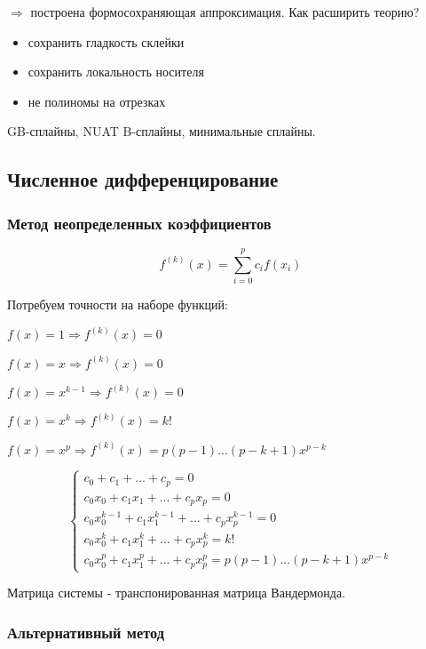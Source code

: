 $\Rightarrow$ построена формосохраняющая аппроксимация. Как расширить теорию? 
\begin{itemize}
    \item сохранить гладкость склейки
    \item сохранить локальность носителя
    \item не полиномы на отрезках
\end{itemize}

GB-сплайны, NUAT B-сплайны, минимальные сплайны.

\subsection{Численное дифференцирование}

\subsubsection{Метод неопределенных коэффициентов}

\begin{equation}
    f^{(k)}(x) = \sum_{i=0}^{p} c_i f(x_i)
\end{equation}

Потребуем точности на наборе функций:

$ f(x) = 1 \Rightarrow f^{(k)}(x) = 0 $

$ f(x) = x \Rightarrow f^{(k)}(x) = 0 $

$ f(x) = x^{k-1} \Rightarrow f^{(k)}(x) = 0 $

$ f(x) = x^k \Rightarrow f^{(k)}(x) = k! $

$ f(x) = x^p \Rightarrow f^{(k)}(x) = p (p - 1) ... (p - k + 1) x^{p - k} $

\begin{equation}
    \begin{cases}
        c_0 + c_1 + ... + c_p = 0\\
        c_0 x_0 + c_1 x_1 + ... + c_p x_p = 0\\
        c_0 x_0^{k-1} + c_1 x_1^{k-1} + ... + c_p x_p^{k-1} = 0\\
        c_0 x_0^k + c_1 x_1^k + ... + c_p x_p^k = k!\\
        c_0 x_0^p + c_1 x_1^p + ... + c_p x_p^p = p (p - 1) ... (p - k + 1) x^{p - k}
    \end{cases}
\end{equation}

Матрица системы - транспонированная матрица Вандермонда.

\subsubsection{Альтернативный метод}

